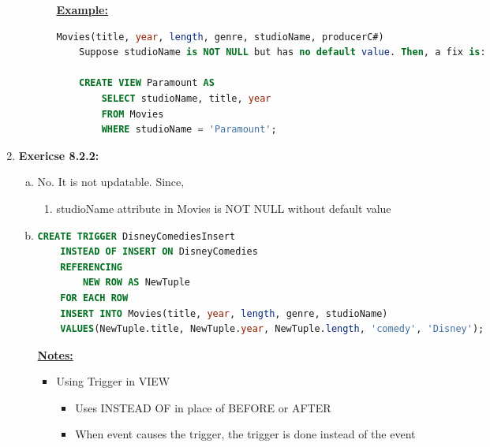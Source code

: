 \documentclass[12pt]{article}
\begin{document}
\begin{enumerate}[1.]
\begin{itemize}
\begin{itemize}
            \bigskip

            \underline{\textbf{Example:}}

            \bigskip

    \begin{lstlisting}[language=SQL]
    Movies(title, year, length, genre, studioName, producerC#)
    Suppose studioName is NOT NULL but has no default value. Then, a fix is:

    CREATE VIEW Paramount AS
        SELECT studioName, title, year
        FROM Movies
        WHERE studioName = 'Paramount';
    \end{lstlisting}

        \end{itemize}
    \end{itemize}

    \bigskip

    \item \textbf{Exericse 8.2.2:}

    \bigskip

    \begin{enumerate}[a)]
        \item No. It is not updatable. Since,

        \begin{enumerate}[1.]
            \item studioName attribute in Movies is NOT NULL without default value
        \end{enumerate}

        \item

    \begin{lstlisting}[language=SQL]
    CREATE TRIGGER DisneyComediesInsert
    INSTEAD OF INSERT ON DisneyComedies
    REFERENCING
        NEW ROW AS NewTuple
    FOR EACH ROW
    INSERT INTO Movies(title, year, length, genre, studioName)
    VALUES(NewTuple.title, NewTuple.year, NewTuple.length, 'comedy', 'Disney');
    \end{lstlisting}

        \bigskip

        \underline{\textbf{Notes:}}

        \bigskip

        \begin{itemize}
            \item Using Trigger in VIEW
            \begin{itemize}
                \item Uses INSTEAD OF in place of BEFORE or AFTER
                \item When event causes the trigger, the trigger is done instead of the event


\end{itemize}
\end{itemize}
\end{enumerate}
\end{enumerate}
\end{document}
